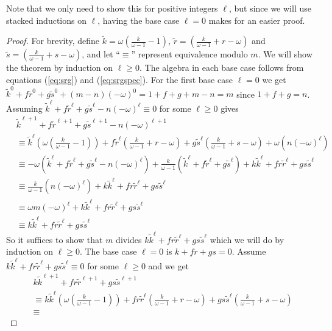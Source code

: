 \documentclass[12pt]{report}
\theoremstyle{definition}
\begin{document}
Note that we only need to show this for positive integers $\ell$, but since we will use stacked inductions on $\ell$, having the base case $\ell=0$ makes for an easier proof.
\begin{proof}
    For brevity, define $\tilde{k}=\omega\left(\frac{k}{\omega -1} -1\right)$, $\tilde{r}=\left(\frac{k}{\omega -1} +r - \omega\right)$ and $\tilde{s}=\left(\frac{k}{\omega -1} +s - \omega\right)$, and let ``$\equiv$'' represent equivalence modulo $m$. We will show the theorem by induction on $\ell \geq 0$. The algebra in each base case follows from equations (\ref{eq:srg}) and (\ref{eq:srgspec}). For the first base case $\ell=0$ we get $\tilde{k}^0 + f\tilde{r}^0 + g\tilde{s}^0 + (m-n)(-\omega)^0 = 1+f+g+m-n=m$ since $1+f+g=n$. Assuming $\tilde{k}^\ell+f\tilde{r}^\ell+g\tilde{s}^\ell-n(-\omega)^\ell \equiv 0$ for some $\ell \geq 0$ gives \begin{align*}
        &\tilde{k}^{\ell +1} + f\tilde{r}^{\ell +1} + g\tilde{s}^{\ell +1} -n(-\omega)^{\ell +1}\\  &\equiv \tilde{k}^\ell\left(\omega\left(\frac{k}{\omega -1} -1\right)\right) + f\tilde{r}^\ell\left(\frac{k}{\omega -1} +r - \omega\right) + g\tilde{s}^\ell\left(\frac{k}{\omega -1} +s - \omega\right) + \omega(n(-\omega)^\ell)\\  &\equiv 
        -\omega(\tilde{k}^\ell+f\tilde{r}^\ell+g\tilde{s}^\ell-n(-\omega)^\ell)+ \frac{k}{\omega -1} (\tilde{k}^\ell+f\tilde{r}^\ell+g\tilde{s}^\ell)+k\tilde{k}^\ell+fr\tilde{r}^\ell+gs\tilde{s}^\ell\\ &\equiv 
        \frac{k}{\omega -1}(n(-\omega)^\ell)+k\tilde{k}^\ell+fr\tilde{r}^\ell+gs\tilde{s}^\ell\\ &\equiv 
        \omega m(-\omega)^\ell+k\tilde{k}^\ell+fr\tilde{r}^\ell+gs\tilde{s}^\ell\\ &\equiv 
        k\tilde{k}^\ell+fr\tilde{r}^\ell+gs\tilde{s}^\ell
    \end{align*}
    So it suffices to show that $m$ divides $k\tilde{k}^\ell+fr\tilde{r}^\ell+gs\tilde{s}^\ell$ which we will do by induction on $\ell \geq 0$. The base case $\ell=0$ is $k+fr+gs=0$. Assume $k\tilde{k}^\ell+fr\tilde{r}^\ell+gs\tilde{s}^\ell \equiv 0$ for some $\ell \geq 0$ and we get 
    \begin{align*}
        & k\tilde{k}^{\ell +1}+fr\tilde{r}^{\ell +1}+gs\tilde{s}^{\ell +1} \\ & \equiv k\tilde{k}^\ell\left(\omega\left(\frac{k}{\omega -1} -1\right)\right)+fr\tilde{r}^\ell\left(\frac{k}{\omega -1} +r - \omega\right)+gs\tilde{s}^\ell\left(\frac{k}{\omega -1} +s - \omega\right) \\ & \equiv 

\end{align*}
\end{proof}
\end{document}
